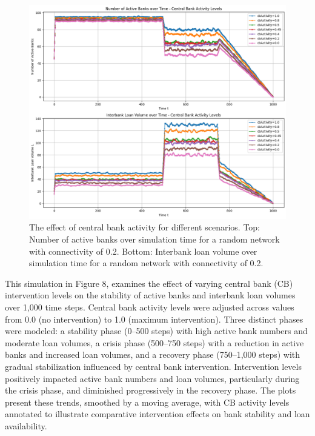 \documentclass{article} %
\begin{document}
\begin{figure}[h]
    \centering
    \includegraphics[width=1.0\linewidth]{Figures/Figure_5.png}
    \caption{The effect of central bank activity for different scenarios. Top: Number of active banks over simulation time for a random network with connectivity of 0.2. Bottom: Interbank loan volume over simulation time for a random network with connectivity of 0.2.
}
    \label{fig:figure5}
\end{figure} 
This simulation in Figure 8, examines the effect of varying central bank (CB) intervention levels on the stability of active banks and interbank loan volumes over 1,000 time steps. Central bank activity levels were adjusted across values from 0.0 (no intervention) to 1.0 (maximum intervention). Three distinct phases were modeled: a stability phase (0--500 steps) with high active bank numbers and moderate loan volumes, a crisis phase (500--750 steps) with a reduction in active banks and increased loan volumes, and a recovery phase (750--1,000 steps) with gradual stabilization influenced by central bank intervention. Intervention levels positively impacted active bank numbers and loan volumes, particularly during the crisis phase, and diminished progressively in the recovery phase. The plots present these trends, smoothed by a moving average, with CB activity levels annotated to illustrate comparative intervention effects on bank stability and loan availability.
\end{document}
